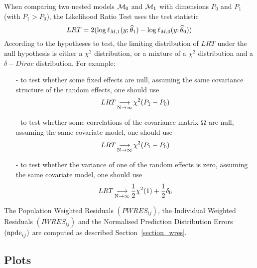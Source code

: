 When comparing two nested models ${\cal M}_0$ and ${\cal M}_1$ with dimensions $P_0$ and $P_1$ (with $P_1>P_0$), the Likelihood Ratio Test uses the test statistic 
$$LRT = 2 ( \log \ell_{M,1}(y;{\widehat{\theta}}_1) -  \log \ell_{M,0}(y;{\widehat{\theta}}_0) )$$
According to the hypotheses to test, the limiting distribution of $LRT$ under the null hypothesis is either a $\chi ^2$ distribution, or a mixture of a $\chi^2$ distribution and a
$\delta-Dirac$ distribution. For example:
\begin{itemize}
\item[-] to test whether some fixed effects are null, assuming the same covariance structure of the random effects, one should use
$$LRT \mathop{\longrightarrow}\limits_{\mathrm{N\to \infty}}^{\mathrm{}} \chi^2(P_1-P_0) $$
\item[-] to test whether some correlations of the covariance matrix ${\Omega}$ are null, assuming the same covariate model, one should use 
$$LRT \mathop{\longrightarrow}\limits_{\mathrm{N\to \infty}}^{\mathrm{}} \chi^2(P_1-P_0) $$
\item[-] to test whether the variance of one of the random effects is zero, assuming the same covariate model, one should use
$$LRT \mathop{\longrightarrow}\limits_{\mathrm{N\to \infty}}^{\mathrm{}} \frac{1}{2} \chi^2(1) + \frac{1}{2}\delta_0 $$
\end{itemize}


The Population Weighted Residuals $(PWRES_{ij})$,  the Individual Weighted Residuals $(IWRES_{ij})$ and the Normalised Prediction Distribution Errors $({\rm npde}_{ij})$ are computed as described Section~\ref{section_wres}.

\newpage
\subsection{Plots} \label{sec:plot.functions}


